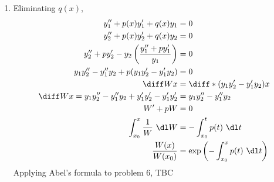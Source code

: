 \begin{enumerate}
\begin{enumerate}
              \item Eliminating $ q(x) $,
                    \begin{align}
                        y_{1}'' + p(x)y_{1}' + q(x)y_{1}                                        & = 0                                                \\
                        y_{2}'' + p(x)y_{2}' + q(x)y_{2}                                        & = 0                                                \\
                        y_{2}'' + py_{2}' - y_{2}\left( \frac{y_{1}'' + py_{1}'}{y_{1}} \right) & = 0                                                \\
                        y_{1}y_{2}'' - y_{1}''y_{2} + p (y_{1}y_{2}' - y_{1}'y_{2})             & = 0                                                \\
                        \diff Wx                                                                & = \diff* {(y_{1}y_{2}' - y_{1}'y_{2})}{x}          \\
                        \diff Wx = y_{1}y_{2}'' - y_{1}''y_{2} + y_{1}'y_{2}' - y_{1}'y_{2}'    & = y_{1}y_{2}'' - y_{1}''y_{2}                      \\
                        W' + pW                                                                 & = 0                                                \\
                        \int_{x_{0}}^{x}\frac{1}{W}\ \dl W                                      & = -\int_{x_{0}}^{t} p(t)\ \dl t                    \\
                        \frac{W(x)}{W(x_{0})}                                                   & = \exp\left( -\int_{x_{0}}^{x} p(t)\ \dl t \right)
                    \end{align}
                    Applying Abel's formula to problem 6, TBC
          \end{enumerate}
\end{enumerate}